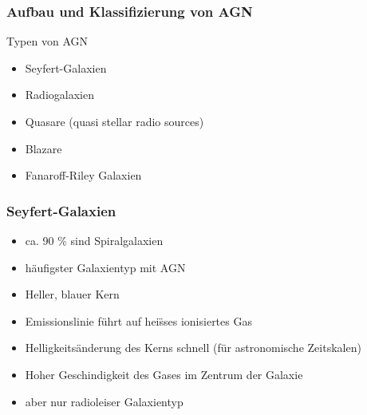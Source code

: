 \documentclass[aspectratio=1610, 9pt]{beamer}
\begin{document}
\begin{frame}\frametitle{Aufbau und Klassifizierung von AGN}
  \begin{block}{Typen von AGN}
    \begin{itemize}
      \item Seyfert-Galaxien
      \item Radiogalaxien
      \item Quasare (quasi stellar radio sources)
      \item Blazare
      \item Fanaroff-Riley Galaxien
    \end{itemize}
  \end{block}
\end{frame}


\begin{frame}\frametitle{Seyfert-Galaxien}
  \begin{itemize}
    \item ca. 90 \% sind Spiralgalaxien
    \item h\"aufigster Galaxientyp mit AGN
    \item Heller, blauer Kern
    \item Emissionslinie f\"uhrt auf hei\"sses ionisiertes Gas
    \item Helligkeits\"anderung des Kerns schnell (f\"ur astronomische Zeitskalen)
    \item Hoher Geschindigkeit des Gases im Zentrum der Galaxie
    \item aber nur radioleiser Galaxientyp
  \end{itemize}
\end{frame}
\end{document}
